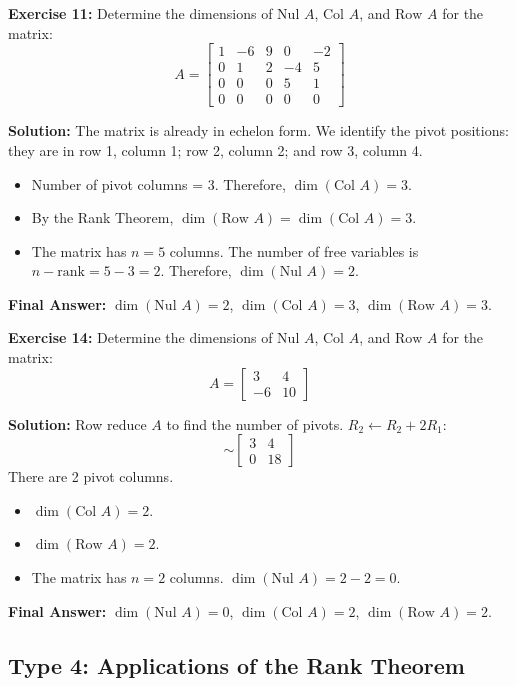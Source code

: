 \documentclass[12pt]{article}
\begin{document}
\textbf{Exercise 11:} Determine the dimensions of $\text{Nul } A$, $\text{Col } A$, and $\text{Row } A$ for the matrix:
\[ A = \begin{bmatrix} 1 & -6 & 9 & 0 & -2 \\ 0 & 1 & 2 & -4 & 5 \\ 0 & 0 & 0 & 5 & 1 \\ 0 & 0 & 0 & 0 & 0 \end{bmatrix} \]

\textbf{Solution:}
The matrix is already in echelon form. We identify the pivot positions: they are in row 1, column 1; row 2, column 2; and row 3, column 4.
\begin{itemize}
    \item Number of pivot columns = 3. Therefore, $\dim(\text{Col } A) = 3$.
    \item By the Rank Theorem, $\dim(\text{Row } A) = \dim(\text{Col } A) = 3$.
    \item The matrix has $n = 5$ columns. The number of free variables is $n - \text{rank} = 5 - 3 = 2$. Therefore, $\dim(\text{Nul } A) = 2$.
\end{itemize}
\textbf{Final Answer:} $\dim(\text{Nul } A) = 2$, $\dim(\text{Col } A) = 3$, $\dim(\text{Row } A) = 3$.

\vspace{0.5cm}
\textbf{Exercise 14:} Determine the dimensions of $\text{Nul } A$, $\text{Col } A$, and $\text{Row } A$ for the matrix:
\[ A = \begin{bmatrix} 3 & 4 \\ -6 & 10 \end{bmatrix} \]

\textbf{Solution:}
Row reduce $A$ to find the number of pivots. $R_2 \leftarrow R_2 + 2R_1$:
\[ \sim \begin{bmatrix} 3 & 4 \\ 0 & 18 \end{bmatrix} \]
There are 2 pivot columns.
\begin{itemize}
    \item $\dim(\text{Col } A) = 2$.
    \item $\dim(\text{Row } A) = 2$.
    \item The matrix has $n = 2$ columns. $\dim(\text{Nul } A) = 2 - 2 = 0$.
\end{itemize}
\textbf{Final Answer:} $\dim(\text{Nul } A) = 0$, $\dim(\text{Col } A) = 2$, $\dim(\text{Row } A) = 2$.

\subsection{Type 4: Applications of the Rank Theorem}
\end{document}
